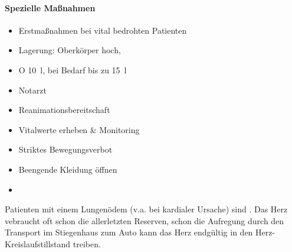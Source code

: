 \begin{gMassnahmenEnv}
    
    \paragraph*{
    Spezielle Ma{\ss}nahmen}
    
    \begin{itemize}
        \item {\color[rgb]{0.0,0.0,0.5019608}
        Erstma{\ss}nahmen bei vital bedrohten Patienten}
        
    \end{itemize}
    \begin{itemize}
        \item {\color[rgb]{0.0,0.0,0.5019608}
        Lagerung: Oberkörper hoch, }
        
        \item {\color[rgb]{0.0,0.0,0.5019608}
        O 10~l, bei Bedarf bis zu 15~l}
        
        \item {\color[rgb]{0.0,0.0,0.5019608}
        Notarzt}
        
        \item {\color[rgb]{0.0,0.0,0.5019608}
        Reanimationsbereitschaft}
        
    \end{itemize}
    \begin{itemize}
        \item {\color[rgb]{0.0,0.0,0.5019608}
        Vitalwerte erheben \& Monitoring}
        
        \item {\mdseries\color[rgb]{0.0,0.0,0.5019608}
        Striktes Bewegungsverbot}
        
        \item {\mdseries\color[rgb]{0.0,0.0,0.5019608}
        Beengende Kleidung öffnen}
        
        \item {\mdseries\color[rgb]{0.0,0.0,0.5019608}
        }
        
    \end{itemize}
    
\end{gMassnahmenEnv}

Patienten mit einem Lungenödem (v.a. bei kardialer Ursache) sind
. Das Herz vebraucht oft
schon die allerletzten Reserven, schon die Aufregung durch den
Transport im Stiegenhaus zum Auto kann das Herz endg\"ultig in den
Herz-Kreislaufstillstand treiben. 

